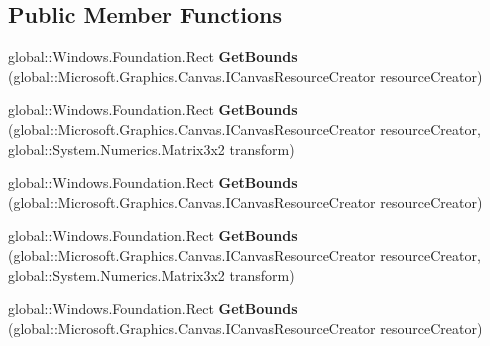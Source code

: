 \subsection*{Public Member Functions}
\begin{DoxyCompactItemize}
\item 
\mbox{\label{interface_microsoft_1_1_graphics_1_1_canvas_1_1_i_canvas_image_a5880a8f26f51e821ddad972938b1fbcc}} 
global\+::\+Windows.\+Foundation.\+Rect {\bfseries Get\+Bounds} (global\+::\+Microsoft.\+Graphics.\+Canvas.\+I\+Canvas\+Resource\+Creator resource\+Creator)
\item 
\mbox{\label{interface_microsoft_1_1_graphics_1_1_canvas_1_1_i_canvas_image_a3bdaec853bbdb697eac7e7c882f007d1}} 
global\+::\+Windows.\+Foundation.\+Rect {\bfseries Get\+Bounds} (global\+::\+Microsoft.\+Graphics.\+Canvas.\+I\+Canvas\+Resource\+Creator resource\+Creator, global\+::\+System.\+Numerics.\+Matrix3x2 transform)
\item 
\mbox{\label{interface_microsoft_1_1_graphics_1_1_canvas_1_1_i_canvas_image_a5880a8f26f51e821ddad972938b1fbcc}} 
global\+::\+Windows.\+Foundation.\+Rect {\bfseries Get\+Bounds} (global\+::\+Microsoft.\+Graphics.\+Canvas.\+I\+Canvas\+Resource\+Creator resource\+Creator)
\item 
\mbox{\label{interface_microsoft_1_1_graphics_1_1_canvas_1_1_i_canvas_image_a3bdaec853bbdb697eac7e7c882f007d1}} 
global\+::\+Windows.\+Foundation.\+Rect {\bfseries Get\+Bounds} (global\+::\+Microsoft.\+Graphics.\+Canvas.\+I\+Canvas\+Resource\+Creator resource\+Creator, global\+::\+System.\+Numerics.\+Matrix3x2 transform)
\item 
\mbox{\label{interface_microsoft_1_1_graphics_1_1_canvas_1_1_i_canvas_image_a5880a8f26f51e821ddad972938b1fbcc}} 
global\+::\+Windows.\+Foundation.\+Rect {\bfseries Get\+Bounds} (global\+::\+Microsoft.\+Graphics.\+Canvas.\+I\+Canvas\+Resource\+Creator resource\+Creator)
\item 
\mbox{\label{interface_microsoft_1_1_graphics_1_1_canvas_1_1_i_canvas_image_a3bdaec853bbdb697eac7e7c882f007d1}} 

\end{DoxyCompactItemize}
